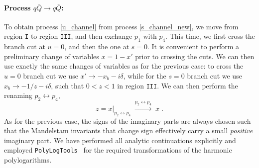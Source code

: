 \paragraph{Process $ q \bar Q \rightarrow  q \bar Q$:} To obtain process \eqref{u_channel} from process \eqref{s_channel_new}, we move from region \texttt{I} to region \texttt{III},  and then exchange  $p_1$ with $p_4$.  This time, we first cross the branch cut at $u=0$, and then the one at $s=0$.  It is convenient to perform a preliminary change of variables $x =1-x'$ prior to crossing the cuts.  We can then use exactly the same changes of variables as for the previous case: to cross the $u=0$ branch cut we use $x' \rightarrow -x_b - i\delta$, while for the $s=0$ branch cut we use $x_b \rightarrow -1/z -i \delta$, such that $0<z<1$ in region \texttt{III}. We can then perform the renaming $p_2 \leftrightarrow p_4$,
\begin{equation}
z = x|_{p_2 \leftrightarrow p_4} \; \xrightarrow{p_2 \leftrightarrow p_4} \; x \; .
\end{equation}
As for the previous case, the signs of the imaginary parts are always chosen
such that the Mandelstam invariants that change sign 
effectively carry a small \emph{positive} imaginary part.
We have performed all analytic continuations explicitly and employed \texttt{PolyLogTools}~\cite{Duhr:2019tlz} for the required transformations of the harmonic polylogarithms.
